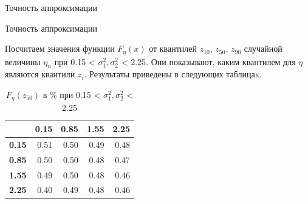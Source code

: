 \documentclass[ucs, notheorems, handout]{beamer}
\begin{document}
\begin{frame}{Точность аппроксимации }
\begin{figure}[h]
\begin{center}
		\end{center}
	\end{figure}	
\end{frame}

\begin{frame}{Точность аппроксимации }
	
	Посчитаем значения функции $F_{\eta}(x)$ от квантилей $z_{10}$, $z_{50}$, $z_{90}$ случайной величины $\eta_{n}$ при 0.15 < $\sigma_{1}^{2}, \sigma_{2}^{2}$ < 2.25. Они показывают, каким квантилем для $\eta$ являются квантили $z_{i}$. Результаты приведены в следующих таблицаx.
	
	\begin{table}[!hhh]
		\centering
		\caption{$F_{\eta}(z_{50})$ в \% при 0.15 < $\sigma_{1}^{2}, \sigma_{2}^{2}$ < 2.25 }
		\label{tab4}
		\begin{tabular}{rrrrr}
			\hline
			& \textbf{0.15} & \textbf{0.85} & \textbf{1.55} & \textbf{2.25} \\
			\hline
			\textbf{0.15} & 0.51 & 0.50 & 0.49 & 0.48 \\ 
			\textbf{0.85} & 0.50 & 0.50 & 0.48 & 0.47 \\ 
			\textbf{1.55} & 0.49 & 0.50 & 0.48 & 0.46 \\ 
			\textbf{2.25} & 0.40 & 0.49 & 0.48 & 0.46 \\ 
			\hline
		\end{tabular}
	\end{table}	
\end{frame}
\end{document}
